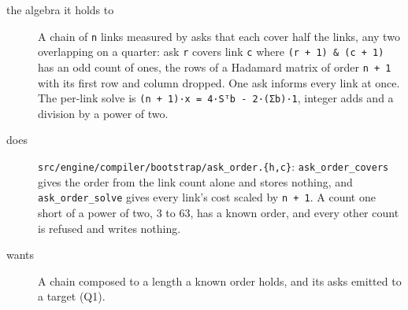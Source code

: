 \begin{description}
\item[{the algebra it holds to}] A chain of \texttt{n} links measured by asks that each cover half the links, any two overlapping on a quarter: ask \texttt{r} covers link \texttt{c} where \texttt{(r + 1) \& (c + 1)} has an odd count of ones, the rows of a Hadamard matrix of order \texttt{n + 1} with its first row and column dropped. One ask informs every link at once. The per-link solve is \texttt{(n + 1)·x = 4·Sᵀb -\allowbreak{} 2·(Σb)·1}, integer adds and a division by a power of two.
\item[{does}] \texttt{src/\allowbreak{}engine/\allowbreak{}compiler/\allowbreak{}bootstrap/\allowbreak{}ask\_\allowbreak{}order.\allowbreak{}\{h,c\}}: \texttt{ask\_\allowbreak{}order\_\allowbreak{}covers} gives the order from the link count alone and stores nothing, and \texttt{ask\_\allowbreak{}order\_\allowbreak{}solve} gives every link's cost scaled by \texttt{n + 1}. A count one short of a power of two, 3 to 63, has a known order, and every other count is refused and writes nothing.
\item[{wants}] A chain composed to a length a known order holds, and its asks emitted to a target (Q1).

\end{description}
